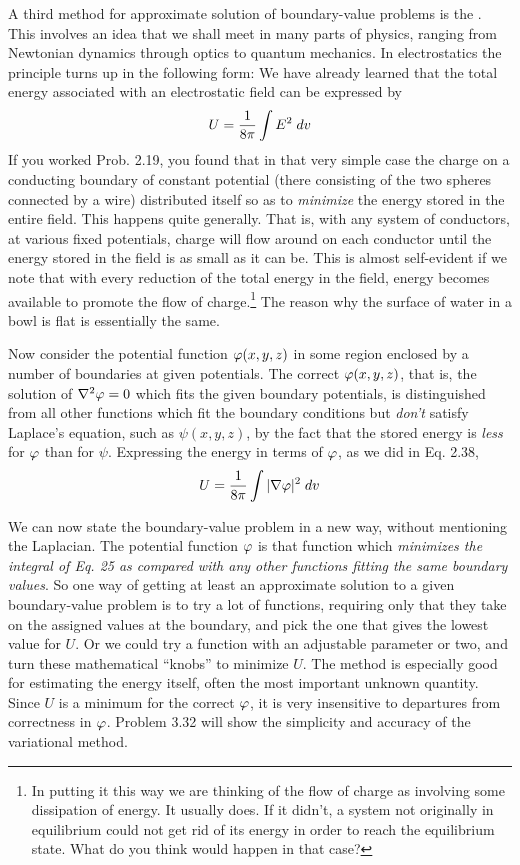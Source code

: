 A third method for approximate solution of boundary-value problems
is the . This involves an idea that we shall
meet in many parts of physics, ranging from Newtonian dynamics
through optics to quantum mechanics. In electrostatics the principle
turns up in the following form: We have already learned that
the total energy associated with an electrostatic field can be expressed
by
\begin{equation}
  U = \frac{1}{8\pi}\int E^2\;d v
\end{equation}
If you worked Prob. 2.19, you found that in that very simple case
the charge on a conducting boundary of constant potential (there
consisting of the two spheres connected by a wire) distributed itself
so as to \emph{minimize} the energy stored in the entire field. This happens
quite generally. That is, with any system of conductors, at various
fixed potentials, charge will flow around on each conductor until the
energy stored in the field is as small as it can be. This is almost 
self-evident if we note that with every reduction of the total energy in
the field, energy becomes available to promote the flow 
of charge.\footnote{In putting it this way we are thinking of the flow of charge as involving some dissipation
of energy. It usually does. If it didn't, a system not originally in equilibrium could
not get rid of its energy in order to reach the equilibrium state. What do you think would
happen in that case?}
The reason why the surface of water in a bowl is flat is essentially
the same.

Now consider the potential function $\varphi(x,y,z)$ in some region enclosed
by a number of boundaries at given potentials. The correct
$\varphi(x,y,z)$, that is, the solution of $\nabla^2\varphi = 0$ which fits the given boundary
potentials, is distinguished from all other functions which fit the
boundary conditions but \emph{don't} satisfy Laplace's equation, such as
$\psi(x,y,z)$, by the fact that the stored energy is \emph{less} for $\varphi$ than for $\psi$.
Expressing the energy in terms of $\varphi$, as we did in Eq. 2.38,
\begin{equation}
  U = \frac{1}{8\pi}\int |\nabla\varphi|^2\;d v
\end{equation}


We can now state the boundary-value problem in a new way,
without mentioning the Laplacian. The potential function $\varphi$ is that
function which \emph{minimizes the integral of Eq. 25 as compared with any
other functions fitting the same boundary values}. So one way of getting
at least an approximate solution to a given boundary-value
problem is to try a lot of functions, requiring only that they take on
the assigned values at the boundary, and pick the one that gives the
lowest value for $U$. Or we could try a function with an adjustable
parameter or two, and turn these mathematical ``knobs'' to minimize
$U$. The method is especially good for estimating the energy
itself, often the most important unknown quantity. Since $U$ is a
minimum for the correct $\varphi$, it is very insensitive to departures from
correctness in $\varphi$. Problem 3.32 will show the simplicity and accuracy
of the variational method.

